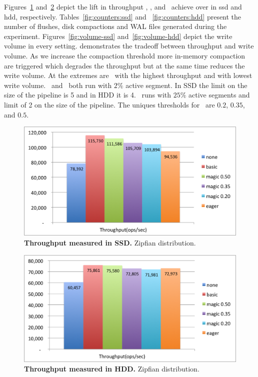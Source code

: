 Figures~\ref{fig:throughput-ssd} and~\ref{fig:throughput-hdd} depict the lift in throughput \basic, \magic, and \eager\ achieve over \none in ssd and hdd, respectively.
Tables~\ref{fig:counters:ssd} and ~\ref{fig:counters:hdd} present the number of flushes, disk compactions and WAL files generated during the experiment.
Figures~\ref{fig:volume-ssd} and~\ref{fig:volume-hdd} depict the write volume in every setting. 
\magic demonstrates the tradeoff between throughput and write volume. As we increase the compaction threshold more in-memory compaction are triggered which degrades the throughput but at the same time reduces the write volume.
At the extremes are \basic\ with the highest throughput and \eager with lowest write volume.
\basic\ and \magic\ both run with $2\%$ active segment. In SSD the limit on the size of the pipeline is 5 and in HDD it is 4.
\eager\ runs with $25\%$ active segments and limit of 2 on the size of the pipeline.
The uniques thresholds for \magic\ are $0.2$, $0.35$, and $0.5$.



\begin{figure}[htb]
\includegraphics[width=\figw]{Figs/throughput-ssd.png}
\caption{{\bf  Throughput measured in SSD.} Zipfian distribution.
}
\label{fig:throughput-ssd}
\end{figure}

\begin{figure}[htb]
\includegraphics[width=\figw]{Figs/throughput-hdd.png}
\caption{{\bf  Throughput measured in HDD.} Zipfian distribution. 
}
\label{fig:throughput-hdd}
\end{figure}


